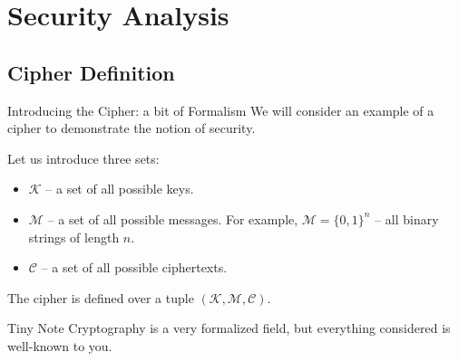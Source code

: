 \documentclass{beamer}
\begin{document}
    \section{Security Analysis}

    \subsection{Cipher Definition}

    \begin{frame}{Introducing the Cipher: a bit of Formalism}
        We will consider an example of a cipher to demonstrate the notion of security.

        Let us introduce three sets:
        \begin{itemize}
            \item $\mathcal{K}$ -- a set of all possible keys.\pause
            \item $\mathcal{M}$ -- a set of all possible messages. For example, $\mathcal{M} = \{0,1\}^n$ -- all binary strings of length $n$.\pause
            \item $\mathcal{C}$ -- a set of all possible ciphertexts.\pause
        \end{itemize}

        The cipher is defined over a tuple $(\mathcal{K}, \mathcal{M}, \mathcal{C})$.\pause

        \begin{block}{Tiny Note}
            Cryptography is a very formalized field, but everything considered is well-known to you.
        \end{block}
    \end{frame}
\end{document}
